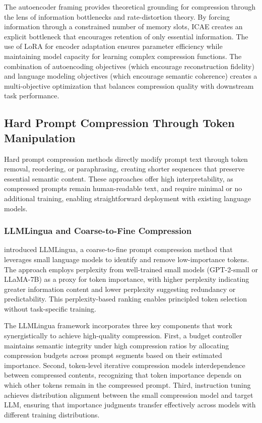 The autoencoder framing provides theoretical grounding for compression through the lens of information bottlenecks and rate-distortion theory. By forcing information through a constrained number of memory slots, ICAE creates an explicit bottleneck that encourages retention of only essential information. The use of LoRA for encoder adaptation ensures parameter efficiency while maintaining model capacity for learning complex compression functions. The combination of autoencoding objectives (which encourage reconstruction fidelity) and language modeling objectives (which encourage semantic coherence) creates a multi-objective optimization that balances compression quality with downstream task performance.

\subsection{Hard Prompt Compression Through Token Manipulation}

Hard prompt compression methods directly modify prompt text through token removal, reordering, or paraphrasing, creating shorter sequences that preserve essential semantic content. These approaches offer high interpretability, as compressed prompts remain human-readable text, and require minimal or no additional training, enabling straightforward deployment with existing language models.

\subsubsection{LLMLingua and Coarse-to-Fine Compression}

\citet{jiang2023llmlingua} introduced LLMLingua, a coarse-to-fine prompt compression method that leverages small language models to identify and remove low-importance tokens. The approach employs perplexity from well-trained small models (GPT-2-small or LLaMA-7B) as a proxy for token importance, with higher perplexity indicating greater information content and lower perplexity suggesting redundancy or predictability. This perplexity-based ranking enables principled token selection without task-specific training.

The LLMLingua framework incorporates three key components that work synergistically to achieve high-quality compression. First, a budget controller maintains semantic integrity under high compression ratios by allocating compression budgets across prompt segments based on their estimated importance. Second, token-level iterative compression models interdependence between compressed contents, recognizing that token importance depends on which other tokens remain in the compressed prompt. Third, instruction tuning achieves distribution alignment between the small compression model and target LLM, ensuring that importance judgments transfer effectively across models with different training distributions.

